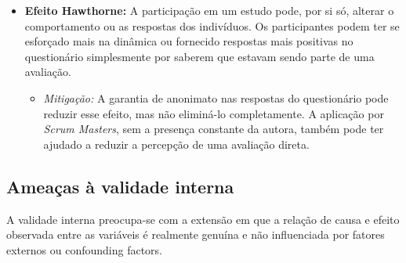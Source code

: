 \documentclass[
	12pt,
	openright,
	twoside,
	a4paper,
	english,
	brazil
	]{abntex2}
\begin{document}
\begin{itemize}
\begin{itemize}
    \end{itemize}
  \item \textbf{Efeito Hawthorne:} A participação em um estudo pode, por si só, alterar o comportamento ou as respostas dos indivíduos. Os participantes podem ter se esforçado mais na dinâmica ou fornecido respostas mais positivas no questionário simplesmente por saberem que estavam sendo parte de uma avaliação.
  \begin{itemize}
    \item \textit{Mitigação:} A garantia de anonimato nas respostas do questionário pode reduzir esse efeito, mas não eliminá-lo completamente. A aplicação por \textit{Scrum Masters}, sem a presença constante da autora, também pode ter ajudado a reduzir a percepção de uma avaliação direta.
    \end{itemize}
\end{itemize}

\subsection{Ameaças à validade interna}
\label{sec:ameacas-interna}

A validade interna preocupa-se com a extensão em que a relação de causa e efeito observada entre as variáveis é realmente genuína e não influenciada por fatores externos ou confounding factors.
\end{document}
